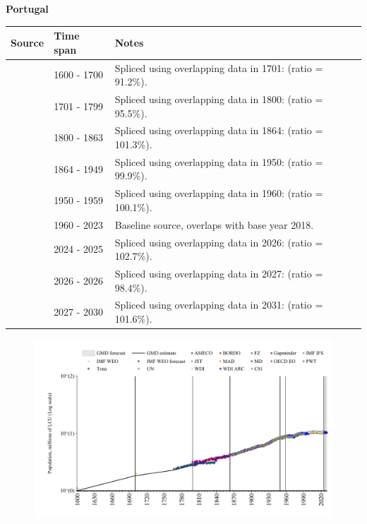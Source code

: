 \documentclass[12pt,a4paper,landscape]{article}
\begin{document}
\begin{adjustbox}{max totalsize={\paperwidth}{\paperheight},center}
\begin{minipage}[t][\textheight][t]{\textwidth}
\vspace*{0.5cm}
{}
\begin{center}
{\Large\bfseries Portugal}
\end{center}
\vspace{0.5cm}
\begin{table}[H]
\centering
\small
\begin{tabular}{|l|l|l|}
\hline
\textbf{Source} & \textbf{Time span} & \textbf{Notes} \\
\hline
\rowcolor{white}\cite{MAD}& 1600 - 1700 &Spliced using overlapping data in 1701: (ratio = 91.2\%).\\
\rowcolor{lightgray}\cite{MD}& 1701 - 1799 &Spliced using overlapping data in 1800: (ratio = 95.5\%).\\
\rowcolor{white}\cite{Gapminder}& 1800 - 1863 &Spliced using overlapping data in 1864: (ratio = 101.3\%).\\
\rowcolor{lightgray}\cite{CS1_PRT}& 1864 - 1949 &Spliced using overlapping data in 1950: (ratio = 99.9\%).\\
\rowcolor{white}\cite{IMF_IFS}& 1950 - 1959 &Spliced using overlapping data in 1960: (ratio = 100.1\%).\\
\rowcolor{lightgray}\cite{WDI}& 1960 - 2023 &Baseline source, overlaps with base year 2018.\\
\rowcolor{white}\cite{OECD_EO}& 2024 - 2025 &Spliced using overlapping data in 2026: (ratio = 102.7\%).\\
\rowcolor{lightgray}\cite{AMECO}& 2026 - 2026 &Spliced using overlapping data in 2027: (ratio = 98.4\%).\\
\rowcolor{white}\cite{Gapminder}& 2027 - 2030 &Spliced using overlapping data in 2031: (ratio = 101.6\%).\\
\hline
\end{tabular}
\end{table}
\begin{figure}[H]
\centering
\includegraphics[width=\textwidth,height=0.6\textheight,keepaspectratio]{graphs/PRT_pop.pdf}
\end{figure}
\end{minipage}
\end{adjustbox}
\end{document}

